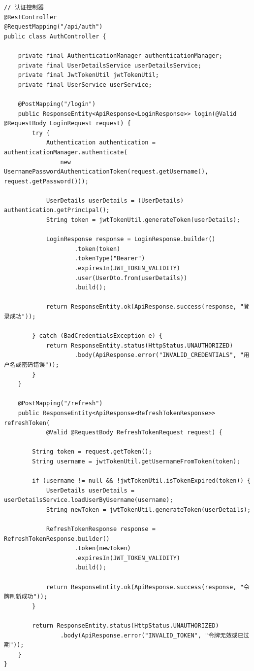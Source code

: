 \begin{lstlisting}[style=java]
// 认证控制器
@RestController
@RequestMapping("/api/auth")
public class AuthController {
    
    private final AuthenticationManager authenticationManager;
    private final UserDetailsService userDetailsService;
    private final JwtTokenUtil jwtTokenUtil;
    private final UserService userService;
    
    @PostMapping("/login")
    public ResponseEntity<ApiResponse<LoginResponse>> login(@Valid @RequestBody LoginRequest request) {
        try {
            Authentication authentication = authenticationManager.authenticate(
                new UsernamePasswordAuthenticationToken(request.getUsername(), request.getPassword()));
                
            UserDetails userDetails = (UserDetails) authentication.getPrincipal();
            String token = jwtTokenUtil.generateToken(userDetails);
            
            LoginResponse response = LoginResponse.builder()
                    .token(token)
                    .tokenType("Bearer")
                    .expiresIn(JWT_TOKEN_VALIDITY)
                    .user(UserDto.from(userDetails))
                    .build();
                    
            return ResponseEntity.ok(ApiResponse.success(response, "登录成功"));
            
        } catch (BadCredentialsException e) {
            return ResponseEntity.status(HttpStatus.UNAUTHORIZED)
                    .body(ApiResponse.error("INVALID_CREDENTIALS", "用户名或密码错误"));
        }
    }
    
    @PostMapping("/refresh")
    public ResponseEntity<ApiResponse<RefreshTokenResponse>> refreshToken(
            @Valid @RequestBody RefreshTokenRequest request) {
        
        String token = request.getToken();
        String username = jwtTokenUtil.getUsernameFromToken(token);
        
        if (username != null && !jwtTokenUtil.isTokenExpired(token)) {
            UserDetails userDetails = userDetailsService.loadUserByUsername(username);
            String newToken = jwtTokenUtil.generateToken(userDetails);
            
            RefreshTokenResponse response = RefreshTokenResponse.builder()
                    .token(newToken)
                    .expiresIn(JWT_TOKEN_VALIDITY)
                    .build();
                    
            return ResponseEntity.ok(ApiResponse.success(response, "令牌刷新成功"));
        }
        
        return ResponseEntity.status(HttpStatus.UNAUTHORIZED)
                .body(ApiResponse.error("INVALID_TOKEN", "令牌无效或已过期"));
    }
}
\end{lstlisting}

